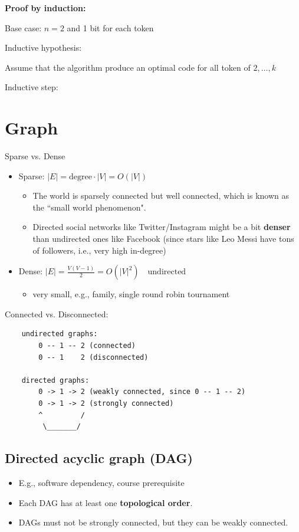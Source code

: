 \documentclass[12pt,a4paper]{article}
\begin{document}
\textbf{Proof by induction:}

Base case: $n=2$ and 1 bit for each token

Inductive hypothesis: 

Assume that the algorithm produce an optimal code for all token of $2,\dots,k$

Inductive step:

\section*{Graph}

Sparse vs. Dense

\begin{itemize}
    \item Sparse: $|E| = \text{degree} \cdot |V| = O(|V|)$
    \begin{itemize}
        \item The world is sparsely connected but well connected, which is known as the ``small world phenomenon". 
        \item Directed social networks like Twitter/Instagram might be a bit \textbf{denser} than undirected ones like Facebook (since stars like Leo Messi have tons of followers, i.e., very high in-degree)
    \end{itemize}
    \item Dense: $|E| = \frac{V(V-1)}{2} = O(|V|^2) \quad \text{undirected}$
    \begin{itemize}
        \item very small, e.g., family, single round robin tournament
    \end{itemize}
\end{itemize}

Connected vs. Disconnected:

\begin{verbatim}
    undirected graphs:
        0 -- 1 -- 2 (connected)
        0 -- 1    2 (disconnected)
    
    directed graphs:
        0 -> 1 -> 2 (weakly connected, since 0 -- 1 -- 2)
        0 -> 1 -> 2 (strongly connected)
        ^         /
         \_______/
\end{verbatim}

\subsection*{Directed acyclic graph (DAG)}

\begin{itemize}
    \item E.g., software dependency, course prerequisite
    \item Each DAG has at least one \textbf{topological order}.
    \item DAGs must not be strongly connected, but they can be weakly connected.
\end{itemize}
\end{document}
